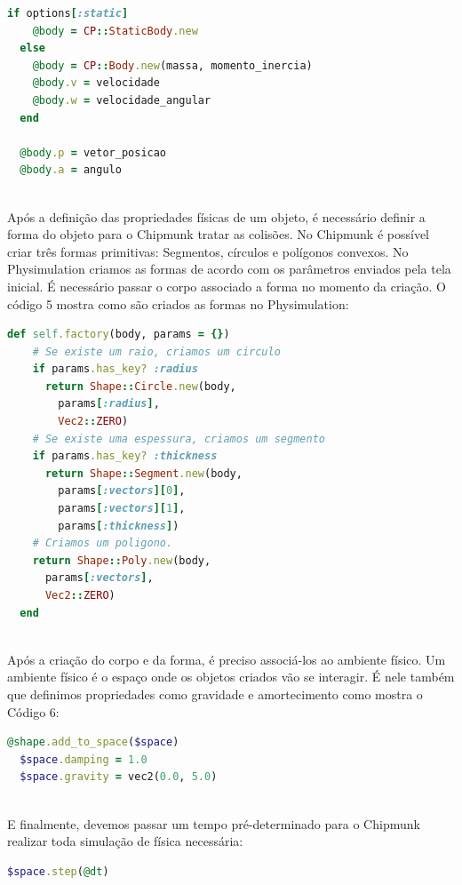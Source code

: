 \begin{lstlisting}[language=Ruby, caption=physics.rb]
  if options[:static]
    @body = CP::StaticBody.new
  else
    @body = CP::Body.new(massa, momento_inercia)
    @body.v = velocidade
    @body.w = velocidade_angular
  end

  @body.p = vetor_posicao
  @body.a = angulo
\end{lstlisting} 

\ \\
Após a definição das propriedades físicas de um objeto, é necessário definir a forma do objeto para o Chipmunk tratar as colisões. No Chipmunk é 
possível criar três formas primitivas: Segmentos, círculos e polígonos convexos. No Physimulation criamos as formas de acordo com os parâmetros enviados
pela tela inicial. É necessário passar o corpo associado a forma no momento da criação. O código 5 mostra como são criados as formas no Physimulation:

\begin{lstlisting}[language=Ruby, caption=physics.rb]
  def self.factory(body, params = {})
    # Se existe um raio, criamos um circulo
    if params.has_key? :radius
      return Shape::Circle.new(body, 
        params[:radius], 
        Vec2::ZERO)
    # Se existe uma espessura, criamos um segmento
    if params.has_key? :thickness
      return Shape::Segment.new(body, 
        params[:vectors][0], 
        params[:vectors][1], 
        params[:thickness])
    # Criamos um poligono.
    return Shape::Poly.new(body, 
      params[:vectors], 
      Vec2::ZERO)
  end
\end{lstlisting} 

\ \\
Após a criação do corpo e da forma, é preciso associá-los ao ambiente físico. Um ambiente físico é o espaço onde os objetos criados vão se interagir. É 
nele também que definimos propriedades como gravidade e amortecimento como mostra o Código 6:

\begin{lstlisting}[language=Ruby, caption=physics.rb]
  @shape.add_to_space($space)
  $space.damping = 1.0
  $space.gravity = vec2(0.0, 5.0)
\end{lstlisting}

\ \\
E finalmente, devemos passar um tempo pré-determinado para o Chipmunk realizar toda simulação de física necessária:

\begin{lstlisting}[language=Ruby, caption=physics.rb]
  $space.step(@dt)
\end{lstlisting}

